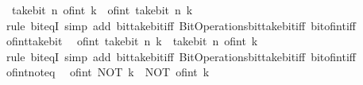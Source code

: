 \begin{isabellebody}
\ \ {\isacartoucheopen}take{\isacharunderscore}{\kern0pt}bit\ n\ {\isacharparenleft}{\kern0pt}of{\isacharunderscore}{\kern0pt}int\ k{\isacharparenright}{\kern0pt}\ {\isacharequal}{\kern0pt}\ of{\isacharunderscore}{\kern0pt}int\ {\isacharparenleft}{\kern0pt}take{\isacharunderscore}{\kern0pt}bit\ n\ k{\isacharparenright}{\kern0pt}{\isacartoucheclose}\isanewline
%
\isadelimproof
\ \ %
\endisadelimproof
%
\isatagproof
{}\isamarkupfalse%
\ {\isacharparenleft}{\kern0pt}rule\ bit{\isacharunderscore}{\kern0pt}eqI{\isacharparenright}{\kern0pt}\ {\isacharparenleft}{\kern0pt}simp\ add{\isacharcolon}{\kern0pt}\ bit{\isacharunderscore}{\kern0pt}take{\isacharunderscore}{\kern0pt}bit{\isacharunderscore}{\kern0pt}iff\ Bit{\isacharunderscore}{\kern0pt}Operations{\isachardot}{\kern0pt}bit{\isacharunderscore}{\kern0pt}take{\isacharunderscore}{\kern0pt}bit{\isacharunderscore}{\kern0pt}iff\ bit{\isacharunderscore}{\kern0pt}of{\isacharunderscore}{\kern0pt}int{\isacharunderscore}{\kern0pt}iff{\isacharparenright}{\kern0pt}%
\endisatagproof
{\isafoldproof}%
%
\isadelimproof
\isanewline
%
\endisadelimproof
\isanewline
{}\isamarkupfalse%
\ of{\isacharunderscore}{\kern0pt}int{\isacharunderscore}{\kern0pt}take{\isacharunderscore}{\kern0pt}bit{\isacharcolon}{\kern0pt}\isanewline
\ \ {\isacartoucheopen}of{\isacharunderscore}{\kern0pt}int\ {\isacharparenleft}{\kern0pt}take{\isacharunderscore}{\kern0pt}bit\ n\ k{\isacharparenright}{\kern0pt}\ {\isacharequal}{\kern0pt}\ take{\isacharunderscore}{\kern0pt}bit\ n\ {\isacharparenleft}{\kern0pt}of{\isacharunderscore}{\kern0pt}int\ k{\isacharparenright}{\kern0pt}{\isacartoucheclose}\isanewline
%
\isadelimproof
\ \ %
\endisadelimproof
%
\isatagproof
{}\isamarkupfalse%
\ {\isacharparenleft}{\kern0pt}rule\ bit{\isacharunderscore}{\kern0pt}eqI{\isacharparenright}{\kern0pt}\ {\isacharparenleft}{\kern0pt}simp\ add{\isacharcolon}{\kern0pt}\ bit{\isacharunderscore}{\kern0pt}take{\isacharunderscore}{\kern0pt}bit{\isacharunderscore}{\kern0pt}iff\ Bit{\isacharunderscore}{\kern0pt}Operations{\isachardot}{\kern0pt}bit{\isacharunderscore}{\kern0pt}take{\isacharunderscore}{\kern0pt}bit{\isacharunderscore}{\kern0pt}iff\ bit{\isacharunderscore}{\kern0pt}of{\isacharunderscore}{\kern0pt}int{\isacharunderscore}{\kern0pt}iff{\isacharparenright}{\kern0pt}%
\endisatagproof
{\isafoldproof}%
%
\isadelimproof
\isanewline
%
\endisadelimproof
\isanewline
{}\isamarkupfalse%
\ of{\isacharunderscore}{\kern0pt}int{\isacharunderscore}{\kern0pt}not{\isacharunderscore}{\kern0pt}eq{\isacharcolon}{\kern0pt}\isanewline
\ \ {\isacartoucheopen}of{\isacharunderscore}{\kern0pt}int\ {\isacharparenleft}{\kern0pt}NOT\ k{\isacharparenright}{\kern0pt}\ {\isacharequal}{\kern0pt}\ NOT\ {\isacharparenleft}{\kern0pt}of{\isacharunderscore}{\kern0pt}int\ k{\isacharparenright}{\kern0pt}{\isacartoucheclose}\isanewline

\end{isabellebody}
